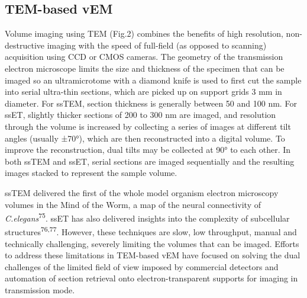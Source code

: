 \documentclass{article}
\begin{document}
\subsection*{TEM-based vEM}

Volume imaging using TEM (Fig.2) combines the benefits of high resolution, non-destructive imaging with the speed of full-field (as opposed to scanning) acquisition using CCD or CMOS cameras. The geometry of the transmission electron microscope limits the size and thickness of the specimen that can be imaged so an ultramicrotome with a diamond knife is used to first cut the sample into serial ultra-thin sections, which are picked up on support grids 3 mm in diameter. For ssTEM, section thickness is generally between 50 and 100 nm. For ssET, slightly thicker sections of 200 to 300 nm are imaged, and resolution through the volume is increased by collecting a series of images at different tilt angles (usually ±70°), which are then reconstructed into a digital volume. To improve the reconstruction, dual tilts may be collected at 90° to each other. In both ssTEM and ssET, serial sections are imaged sequentially and the resulting images stacked to represent the sample volume.

ssTEM delivered the first of the whole model organism electron microscopy volumes in the Mind of the Worm, a map of the neural connectivity of \emph{C.elegans}\textsuperscript{75}. ssET has also delivered insights into the complexity of subcellular structures\textsuperscript{76,77}. However, these techniques are slow, low throughput, manual and technically challenging, severely limiting the volumes that can be imaged. Efforts to address these limitations in TEM-based vEM have focused on solving the dual challenges of the limited field of view imposed by commercial detectors and automation of section retrieval onto electron-transparent supports for imaging in transmission mode.
\end{document}
